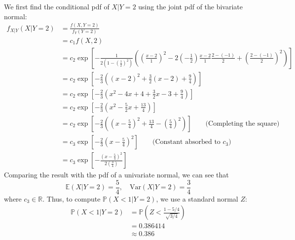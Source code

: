 \documentclass[12pt]{article}
\begin{document}
We first find the conditional pdf of $X | Y = 2$ using the joint pdf of the bivariate normal: \begin{align*}
    f_{X|Y}(X | Y = 2) &= \frac{f(X,Y=2)}{f_Y(Y=2)} \\ 
    &= c_{1} f(X,2) \\ 
    &= c_{2} \exp \left[ -\frac{1}{2(1-(\frac{1}{2})^{2})}\left( \left( \frac{x-2}{1} \right)^{2} - 2\left(-\frac{1}{2}\right) \frac{x-2}{1} \frac{2-(-1)}{2} + \left( \frac{2-(-1)}{2} \right)^{2} \right) \right] \\ 
    &= c_{2} \exp \left[ -\frac{2}{3} \left( (x-2)^{2} + \frac{3}{2}(x-2) + \frac{9}{4} \right) \right] \\ 
    &= c_{2} \exp \left[ -\frac{2}{3}\left(x^{2}-4x+4+\frac{3}{2}x - 3 + \frac{9}{4}\right) \right] \\ 
    &= c_{2} \exp \left[ -\frac{2}{3}(x^{2} - \frac{5}{2}x + \frac{13}{4}) \right] \\ 
    &= c_{2} \exp \left[ -\frac{2}{3} \left( \left(x-\frac{5}{4}\right)^{2} + \frac{13}{4} - \left(\frac{5}{4}\right)^{2} \right) \right] \qquad \text{(Completing the square)}\\ 
    &= c_{3} \exp \left[ -\frac{2}{3}(x-\frac{5}{4})^{2} \right] \qquad \text{(Constant absorbed to }c_3)\\ 
    &= c_{3} \exp \left[ - \frac{(x-\frac{5}{4})^{2}}{2(\frac{3}{4})} \right] 
\end{align*} Comparing the result with the pdf of a univariate normal, we can see that \begin{equation*}
    \mathbb{E}(X | Y = 2) = \frac{5}{4}, \quad \text{Var}(X | Y = 2) = \frac{3}{4}
\end{equation*} where $c_{3} \in \mathbb{R}$. Thus, to compute $ \mathbb{P}(X < 1 | Y = 2)$, we use a standard normal $Z$: \begin{align*}
    \mathbb{P}(X < 1 | Y = 2) &= \mathbb{P}\left(Z < \frac{1- 5 / 4}{\sqrt{3 / 4}}\right) \\ 
    &= 0.386414 \\ 
    &\boxed{\approx 0.386}
\end{align*}
\end{document}
